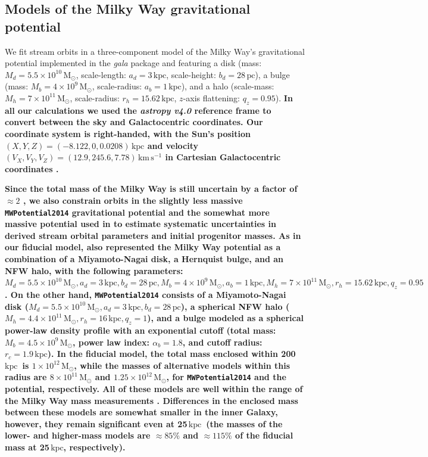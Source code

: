 \documentclass[twocolumn]{aastex63}
\newcommand{\package}[1]{\textsl{#1}}
\newcommand{\msun}{\ensuremath{\textrm{M}_\odot}}
\newcommand{\kpc}{\ensuremath{\textrm{kpc}}}
\newcommand{\pc}{\ensuremath{\textrm{pc}}}
\newcommand{\kms}{\ensuremath{\textrm{km}\,\textrm{s}^{-1}}}
\newcommand{\changes}[1]{{\textbf{#1}}}
\begin{document}
\subsection{Models of the Milky Way gravitational potential}
We fit stream orbits in a three-component model of the Milky Way's gravitational potential implemented in the \package{gala} package \citep{gala} and featuring a \citet{mn:1975} disk (mass: $M_d = 5.5\times10^{10}\,\msun$, scale-length: $a_d = 3\,\kpc$, scale-height: $b_d = 28\,\pc$), a \citet{hernquist:1990} bulge (mass: $M_b = 4\times10^9\,\msun$, scale-radius: $a_b = 1\,\kpc$), and a \citet{nfw:1997} halo (scale-mass: $M_h = 7\times10^{11}\,\msun$, scale-radius: $r_h = 15.62\,\kpc$, $z$-axis flattening: $q_z = 0.95$).
\changes{In all our calculations we used the \package{astropy v4.0} reference frame to convert between the sky and Galactocentric coordinates.
Our coordinate system is right-handed, with the Sun's position $(X,Y,Z)=(-8.122,0,0.0208)\,\kpc$ and velocity $(V_X, V_Y, V_Z) = (12.9, 245.6, 7.78)\,\kms$ in Cartesian Galactocentric coordinates \citep{gravity:2018, bennett:2019, reid:2004, drimmel:2018}.}

\changes{Since the total mass of the Milky Way is still uncertain by a factor of $\approx2$ \citep[e.g.,][]{wang:2020}, we also constrain orbits in the slightly less massive \texttt{MWPotential2014} gravitational potential \citep{bovy:2015} and the somewhat more massive potential used in \citet{pwb} to estimate systematic uncertainties in derived stream orbital parameters and initial progenitor masses.
As in our fiducial model, \citet{pwb} also represented the Milky Way potential as a combination of a Miyamoto-Nagai disk, a Hernquist bulge, and an NFW halo, with the following parameters: $M_d = 5.5\times10^{10}\,\msun, a_d=3\,\kpc, b_d=28\,\pc, M_b=4\times10^9\,\msun, a_b=1\,\kpc, M_h=7\times10^{11}\,\msun, r_h=15.62\,\kpc, q_z=0.95$.
On the other hand, \texttt{MWPotential2014} consists of a Miyamoto-Nagai disk ($M_d = 5.5\times10^{10}\,\msun, a_d=3\,\kpc, b_d=28\,\pc$), a spherical NFW halo ($M_h=4.4\times10^{11}\,\msun, r_h=16\,\kpc, q_z=1$), and a bulge modeled as a spherical power-law density profile with an exponential cutoff (total mass: $M_b=4.5\times10^9\,\msun$, power law index: $\alpha_b=1.8$, and cutoff radius: $r_c=1.9\,\kpc$).
In the fiducial model, the total mass enclosed within 200\,\kpc\ is $1\times10^{12}\,\msun$, while the masses of alternative models within this radius are $8\times10^{11}\,\msun$ and $1.25\times10^{12}\,\msun$, for \texttt{MWPotential2014} and the \citet{pwb} potential, respectively.
All of these models are well within the range of the Milky Way mass measurements \citep{wang:2020}.
Differences in the enclosed mass between these models are somewhat smaller in the inner Galaxy, however, they remain significant even at 25\,\kpc\ (the masses of the lower- and higher-mass models are $\approx85\%$ and $\approx115\%$ of the fiducial mass at 25\,\kpc, respectively).
}
\end{document}
